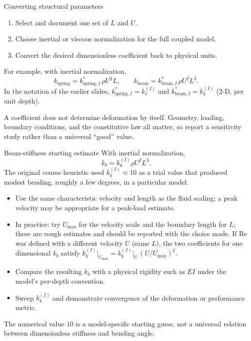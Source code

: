 \documentclass[aspectratio=169,11pt]{beamer}
\begin{document}
\begin{frame}{Converting structural parameters}
\begin{enumerate}\itemsep7pt
  \item Select and document one set of $L$ and $U$.
  \item Choose inertial or viscous normalization for the full coupled model.
  \item Convert the desired dimensionless coefficient back to physical units.
\end{enumerate}

For example, with inertial normalization,
\[
  k_{\mathrm{spring}}
  =k_{\mathrm{spring},I}^*\,\rho U^2L,
  \qquad
  k_{\mathrm{beam}}
  =k_{\mathrm{beam},I}^*\,\rho U^2L^3.
\]
{\small In the notation of the earlier slides, $k_{\mathrm{spring},I}^*=k_s^{(I)}$ and $k_{\mathrm{beam},I}^*=k_b^{(I)}$ (2-D, per unit depth).}

\begin{punchbox}
\small A coefficient does not determine deformation by itself. Geometry, loading, boundary conditions, and the constitutive law all matter, so report a sensitivity study rather than a universal ``good'' value.
\end{punchbox}
\end{frame}

\begin{frame}{Beam-stiffness starting estimate}
\small
With inertial normalization,
\[
  k_b=k_b^{(I)}\rho U^2L^3.
\]
The original course heuristic used $k_b^{(I)}\approx10$ as a trial value that produced modest bending, roughly a few degrees, in a particular model.

\begin{itemize}\itemsep2pt
  \item Use the same characteristic velocity and length as the fluid scaling; a peak velocity may be appropriate for a peak-load estimate.
  \item In practice: try $U_{\max}$ for the velocity scale and the boundary length for $L$; these are rough estimates and should be reported with the choice made. If $\mathrm{Re}$ was defined with a different velocity $U$ (same $L$), the two coefficients for one dimensional $k_b$ satisfy $k_b^{(I)}\big|_{U_{\max}}=k_b^{(I)}\big|_{U}\,(U/U_{\max})^2$.
  \item Compare the resulting $k_b$ with a physical rigidity such as $EI$ under the model's per-depth convention.
  \item Sweep $k_b^{(I)}$ and demonstrate convergence of the deformation or performance metric.
\end{itemize}
\begin{punchbox}
\small The numerical value $10$ is a model-specific starting guess, not a universal relation between dimensionless stiffness and bending angle.
\end{punchbox}
\end{frame}
\end{document}
